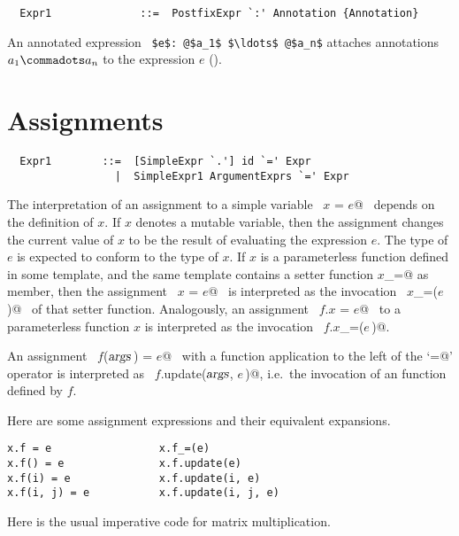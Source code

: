 \syntax\begin{lstlisting}
  Expr1              ::=  PostfixExpr `:' Annotation {Annotation} 
\end{lstlisting}

An annotated expression ~\lstinline^$e$: @$a_1$ $\ldots$ @$a_n$^
attaches annotations $a_1 \commadots a_n$ to the expression $e$
().

\section{Assignments}\label{sec:assigments}

\syntax\begin{lstlisting}
  Expr1        ::=  [SimpleExpr `.'] id `=' Expr
                 |  SimpleExpr1 ArgumentExprs `=' Expr
\end{lstlisting}

The interpretation of an assignment to a simple variable ~\lstinline@$x$ = $e$@~
depends on the definition of $x$. If $x$ denotes a mutable
variable, then the assignment changes the current value of $x$ to be
the result of evaluating the expression $e$. The type of $e$ is
expected to conform to the type of $x$. If $x$ is a parameterless
function defined in some template, and the same template contains a
setter function \lstinline@$x$_=@ as member, then the assignment
~\lstinline@$x$ = $e$@~ is interpreted as the invocation
~\lstinline@$x$_=($e\,$)@~ of that setter function.  Analogously, an
assignment ~\lstinline@$f.x$ = $e$@~ to a parameterless function $x$
is interpreted as the invocation ~\lstinline@$f.x$_=($e\,$)@.

An assignment ~\lstinline@$f$($\mbox{\sl args}\,$) = $e$@~ with a function application to the
left of the `\lstinline@=@' operator is interpreted as 
~\lstinline@$f.$update($\mbox{\sl args}$, $e\,$)@, i.e.\
the invocation of an  function defined by $f$.

\example
Here are some assignment expressions and their equivalent expansions.
\begin{lstlisting}
x.f = e                 x.f_=(e)
x.f() = e               x.f.update(e)
x.f(i) = e              x.f.update(i, e)
x.f(i, j) = e           x.f.update(i, j, e)
\end{lstlisting}

\example \label{ex:imp-mat-mul}
Here is the usual imperative code for matrix multiplication.

